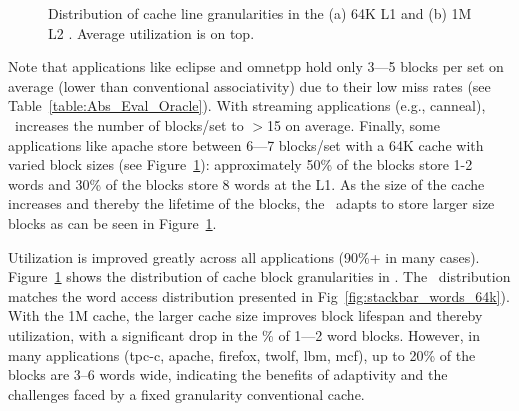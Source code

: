{\begin{figure}[!h]
  \caption[Distribution of cache block sizes]{Distribution of cache line granularities in the (a) 64K L1 and (b) 1M L2 \AC{}. Average utilization is on top.}
  \label{fig:StackBar_PredictorSize_64K}
\end{figure}

Note that applications like eclipse and omnetpp hold only 3---5 blocks per set on average (lower than conventional associativity) due to their low miss rates (see Table~\ref{table:Abs_Eval_Oracle}). With streaming applications (e.g., canneal), \AC\ increases the number of blocks/set to $>$15 on average. Finally, some applications like apache store between 6---7 blocks/set with a 64K cache with varied block sizes (see Figure~\ref{fig:StackBar_PredictorSize_64K}): approximately 50\% of the blocks store 1-2 words and 30\% of the blocks store 8 words at the L1. As the size of the cache increases and thereby the lifetime of the blocks, the \AC\ adapts to store larger size blocks as can be seen in Figure~\ref{fig:StackBar_PredictorSize_64K}.

Utilization is improved greatly across all applications (90\%+ in many cases). Figure~\ref{fig:StackBar_PredictorSize_64K} shows the distribution of cache block granularities in \AC{}. The \AB\ distribution matches the word access distribution presented in Fig~\ref{fig:stackbar_words_64k}). With the 1M cache, the larger cache size improves block lifespan and thereby utilization, with a significant drop in the \% of 1---2 word blocks. However, in many applications (tpc-c, apache, firefox, twolf, lbm, mcf), up to 20\% of the blocks are 3--6 words wide, indicating the benefits of adaptivity and the challenges faced by a fixed granularity conventional cache.

}

